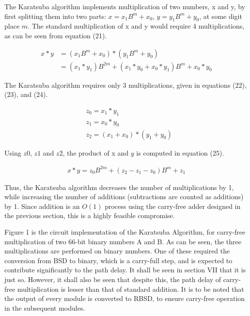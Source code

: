 \documentclass[conference]{IEEEtran_IBSS}
\begin{document}
The Karatsuba algorithm implements multiplication of two numbers, x and y, by first splitting them into two parts: $x = x_{1}B^{m} + x_{0}$, $y = y_{1}B^{m} + y_{0}$, at some digit place $m$. The standard multiplication of x and y would require 4 multiplications, as can be seen from equation (21).

\vspace{-1em}
\begin{equation}
\begin{aligned}
x * y &= (x_{1}B^{m} + x_{0}) * (y_{1}B^{m} + y_{0})\\
&= (x_{1} * y_{1})B^{2m} + (x_{1}*y_{0} + x_{0}*y_{1})B^{m} + x_{0}*y_{0}
\end{aligned}
\end{equation}

The Karatsuba algorithm requires only 3 multiplications, given in equations (22), (23), and (24).

\vspace{-1em}
\begin{align}
&z_{0} = x_{1} * y_{1}\\
&z_{1} = x_{0} * y_{0}\\
&z_{2} = (x_{1} + x_{0}) * (y_{1} + y_{0})
\end{align}

Using $z0$, $z1$ and $z2$, the product of x and $y$ is computed in equation (25).

\vspace{-1em}
\begin{align}
x * y = z_{0}B^{2m} + (z_{2} - z_{1} - z_{0})B^{m} + z_{1}
\end{align}

Thus, the Karatsuba algorithm decreases the number of multiplications by 1, while increasing the number of additions (subtractions are counted as additions) by 1. Since addition is an $O(1)$ process using the carry-free adder designed in the previous section, this is a highly feasible compromise.

Figure 1 is the circuit implementation of the Karatsuba Algorithm, for carry-free multiplication of two 66-bit binary numbers A and B. As can be seen, the three multiplications are performed on binary numbers. One of these required the conversion from BSD to binary, which is a carry-full step, and is expected to contribute significantly to the path delay. It shall be seen in section VII that it is just so. However, it shall also be seen that despite this, the path delay of carry-free multiplication is lesser than that of standard addition. It is to be noted that the output of every module is converted to RBSD, to ensure carry-free operation in the subsequent modules.
\end{document}
